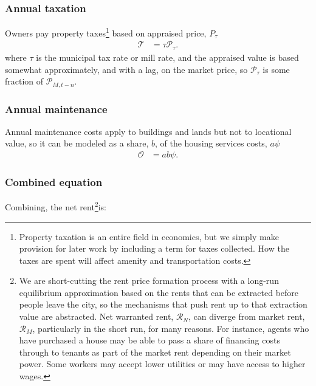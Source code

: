 \subsubsection{Annual taxation}
Owners pay property taxes\footnote{Property taxation is an entire field in economics, but we simply make provision for later work by including a term for taxes collected. How the taxes are spent will affect amenity and transportation costs.} based on appraised price, $P_{\tau}$
\begin{align*}
\mathcal{T} &= \tau  \mathcal{P}_{\tau}.
\end{align*}
where $\tau$ is the municipal tax rate or \gls{mill rate}, and the \gls{appraised value} is based somewhat approximately, and with a lag, on the \gls{market price}, so $\mathcal{P}_{\tau}$ is some fraction of $\mathcal{P}_{M, t-n}$.



\subsubsection{Annual maintenance}
Annual maintenance costs apply to buildings and lands but not to locational value, so it can be modeled as a share, $b$, of the housing services costs, $a \psi$ 
\begin{align}
\mathcal{O} &= a b \psi.
\end{align}

\subsubsection{Combined equation}
Combining, the \gls{net rent}\footnote{We are short-cutting the rent price formation process with a long-run equilibrium approximation based on the rents that can be extracted before people leave the city, so the mechanisms that push rent up to that extraction value are abstracted. Net warranted rent, $\mathcal{R}_N$, can diverge from market rent, $\mathcal{R}_M$, particularly in the short run, for many reasons. For instance, agents who have purchased a house may be able to pass a share of financing costs through to tenants as part of the market rent depending on their market power. Some workers may accept lower utilities or may have access to higher wages. %
% 
}is:

